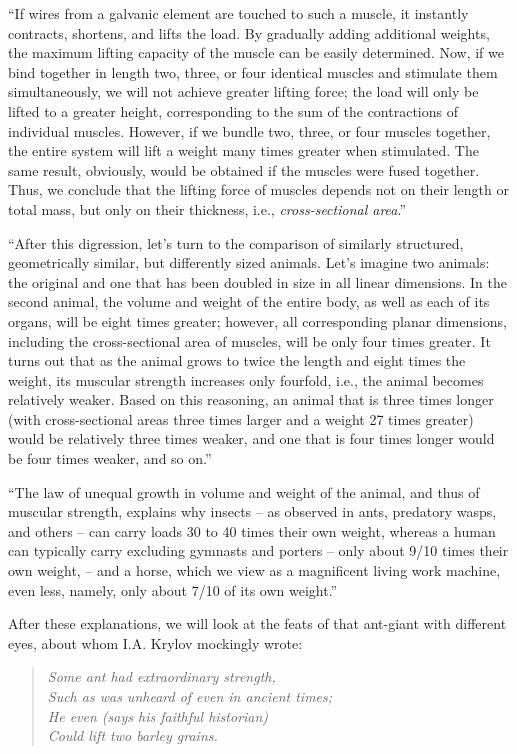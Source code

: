 ``If wires from a galvanic element are touched to such a muscle, it instantly contracts, shortens, and lifts the load. By gradually adding additional weights, the maximum lifting capacity of the muscle can be easily determined. Now, if we bind together in length two, three, or four identical muscles and stimulate them simultaneously, we will not achieve greater lifting force; the load will only be lifted to a greater height, corresponding to the sum of the contractions of individual muscles. However, if we bundle two, three, or four muscles together, the entire system will lift a weight many times greater when stimulated. The same result, obviously, would be obtained if the muscles were fused together. Thus, we conclude that the lifting force of muscles depends not on their length or total mass, but only on their thickness, i.e., \emph{cross-sectional area}.''

``After this digression, let's turn to the comparison of similarly structured, geometrically similar, but differently sized animals. Let's imagine two animals: the original and one that has been doubled in size in all linear dimensions. In the second animal, the volume and weight of the entire body, as well as each of its organs, will be eight times greater; however, all corresponding planar dimensions, including the cross-sectional area of muscles, will be only four times greater. It turns out that as the animal grows to twice the length and eight times the weight, its muscular strength increases only fourfold, i.e., the animal becomes relatively weaker. Based on this reasoning, an animal that is three times longer (with cross-sectional areas three times larger and a weight 27 times greater) would be relatively three times weaker, and one that is four times longer would be four times weaker, and so on.''

``The law of unequal growth in volume and weight of the animal, and thus of muscular strength, explains why insects -- as observed in ants, predatory wasps, and others -- can carry loads 30 to 40 times their own weight, whereas a human can typically carry excluding gymnasts and porters -- only about 9/10 times their own weight, -- and a horse, which we view as a magnificent living work machine, even less, namely, only about 7/10 of its own weight.''

After these explanations, we will look at the feats of that ant-giant with different eyes, about whom I.A. Krylov mockingly wrote:
\begin{quote}
\emph{Some ant had extraordinary strength,\\
 Such as was unheard of even in ancient times; \\
 He even (says his faithful historian)\\
 Could lift two barley grains.}
\end{quote} 



